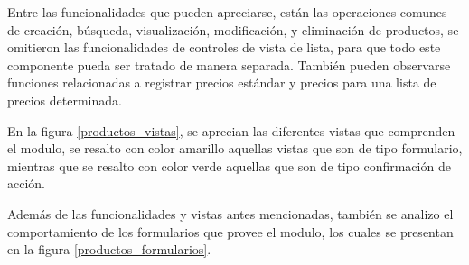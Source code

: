 Entre las funcionalidades que pueden apreciarse, están las operaciones comunes
de creación, búsqueda, visualización, modificación, y eliminación de productos,
se omitieron las funcionalidades de controles de vista de lista, para que
todo este componente pueda ser tratado de manera separada. También pueden
observarse funciones relacionadas a registrar precios estándar y precios para
una lista de precios determinada.

En la figura \ref{productos_vistas}, se aprecian las diferentes vistas que
comprenden el modulo, se resalto con color amarillo aquellas vistas que son de
tipo formulario, mientras que se resalto con color verde aquellas que son de
tipo confirmación de acción.

Además de las funcionalidades y vistas antes mencionadas, también se analizo el
comportamiento de los formularios que provee el modulo, los cuales se presentan
en la figura \ref{productos_formularios}.

